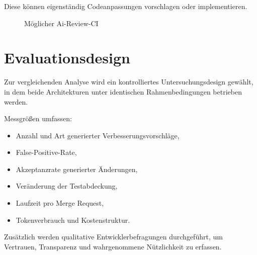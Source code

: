 Diese können eigenständig Codeanpassungen vorschlagen oder implementieren.


\begin{figure}[htbp]
\centering
\caption{Möglicher Ai-Review-CI}
\label{fig:ai-review-ci}
\end{figure}


\section{Evaluationsdesign}

Zur vergleichenden Analyse wird ein kontrolliertes Untersuchungsdesign gewählt, in dem beide Architekturen unter identischen Rahmenbedingungen betrieben werden.

Messgrößen umfassen:

\begin{itemize}
	\item Anzahl und Art generierter Verbesserungsvorschläge,
	\item False-Positive-Rate,
	\item Akzeptanzrate generierter Änderungen,
	\item Veränderung der Testabdeckung,
	\item Laufzeit pro Merge Request,
	\item Tokenverbrauch und Kostenstruktur.
\end{itemize}

Zusätzlich werden qualitative Entwicklerbefragungen durchgeführt, um Vertrauen, Transparenz und wahrgenommene Nützlichkeit zu erfassen.